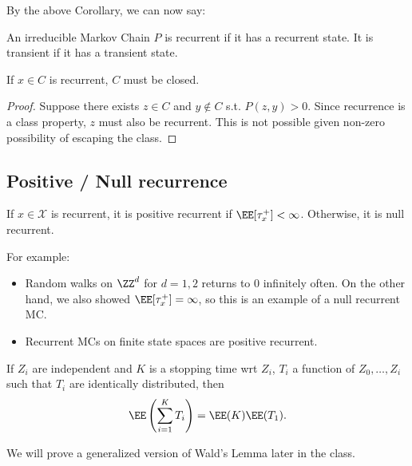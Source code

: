 By the above Corollary, we can now say: 

\begin{definition}

An irreducible Markov Chain $P$ is \ac{recurrent} if it has a recurrent state. It is \ac{transient} if it has a transient state. 
\end{definition}

\begin{theorem}
\proplabel

If $x\in C$ is recurrent, $C$ must be closed.
\end{theorem}

\begin{proof}
Suppose there exists $z\in C$ and $y\not\in C$ s.t. $P(z,y) > 0$. Since recurrence is a class property, $z$ must also be recurrent. This is not possible given non-zero possibility of escaping the class. 
\end{proof}

\subsection{Positive / Null recurrence}

\begin{definition}

If $x\in \mathcal{X}$ is recurrent, it is \ac{positive recurrent} if $\EE[\tau_x^+]<\infty$. Otherwise, it is null recurrent. 
\end{definition}

For example:

\begin{itemize}
    \item Random walks on $\ZZ^d$ for $d=1,2$ returns to $0$ infinitely often. On the other hand, we also showed $\EE[\tau_x^+] = \infty$, so this is an example of a null recurrent MC. 
    \item Recurrent MCs on finite state spaces are positive recurrent. 
\end{itemize}

\begin{theorem}

If $Z_i$ are independent and $K$ is a stopping time wrt $Z_i$, $T_i$ a function of $Z_0, \hdots, Z_i$ such that $T_i$ are identically distributed, then 
\[\EE\left(\sum_{i=1}^KT_i\right) = \EE(K)\EE(T_1).\]
\end{theorem}

We will prove a generalized version of Wald's Lemma later in the class. 

